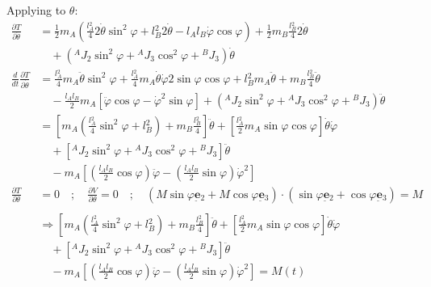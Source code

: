 \documentclass[12pt]{article}
\newcommand{\vb}[1]{{\underset{\tilde{}}{\mathbf{#1}}}}
\begin{document}
 Applying to $\theta$: 
\begin{align*}
    \frac{\partial T}{\partial \dot{\theta}} &= \frac{1}{2}m{}_A \left( \frac{l{}_A^2}{4} 2\dot{\theta}\sin^2\varphi + l{}_B^2 2\dot{\theta} - l{}_A l{}_B \dot{\varphi}\cos\varphi \right) + \frac{1}{2}m{}_B \frac{l{}_B^2}{4} 2\dot{\theta} \\ & \quad + \left({}^A J{}_2 \sin^2\varphi + {}^A J{}_3 \cos^2\varphi + {}^B J{}_3\right) \dot{\theta} \\
    \frac{d}{dt}\frac{\partial T}{\partial \dot{\theta}} &= \frac{l{}_A^2}{4} m{}_A \ddot{\theta}\sin^2\varphi + \frac{l{}_A^2}{4} m{}_A \dot{\theta}\dot{\varphi} 2\sin\varphi\cos\varphi + l{}_B^2 m{}_A \ddot{\theta} + m{}_B \frac{l{}_B^2}{4} \ddot{\theta} \\
    &\quad - \frac{l{}_A l{}_B}{2} m{}_A [\ddot{\varphi}\cos\varphi - \dot{\varphi}^2\sin\varphi] + \left({}^A J{}_2 \sin^2\varphi + {}^A J{}_3 \cos^2\varphi + {}^B J{}_3\right) \ddot{\theta} \\
    &= \left[ m{}_A \left( \frac{l{}_A^2}{4}\sin^2\varphi + l{}_B^2 \right) + m{}_B \frac{l{}_B^2}{4} \right] \ddot{\theta} + \left[ \frac{l{}_A^2}{2} m{}_A \sin\varphi\cos\varphi \right] \dot{\theta}\dot{\varphi}\\ &\quad + \left[ {}^A J{}_2 \sin^2\varphi + {}^A J{}_3 \cos^2\varphi + {}^B J{}_3 \right] \ddot{\theta} \\
    &\quad - m{}_A \left[ \left(\frac{l{}_A l{}_B}{2}\cos\varphi\right)\ddot{\varphi} - \left(\frac{l{}_A l{}_B}{2}\sin\varphi\right)\dot{\varphi}^2 \right] \\
    \frac{\partial T}{\partial \theta} &= 0 \quad ; \quad \frac{\partial V}{\partial \theta} = 0 \quad ; \quad (M\sin\varphi \vb{e}{}_2 + M\cos\varphi \vb{e}{}_3) \cdot (\sin\varphi \vb{e}{}_2 + \cos\varphi \vb{e}{}_3) = M \\
    \\
    &\Rightarrow \left[ m{}_A \left(\frac{l{}_A^2}{4}\sin^2\varphi + l{}_B^2\right) + m{}_B \frac{l{}_B^2}{4} \right] \ddot{\theta} + \left[ \frac{l{}_A^2}{2} m{}_A \sin\varphi \cos\varphi \right] \dot{\theta}\dot{\varphi}\\ &\quad + \left[ {}^A J{}_2 \sin^2\varphi + {}^A J{}_3 \cos^2\varphi + {}^B J{}_3 \right]\ddot{\theta} \\
    &\quad - m{}_A \left[ \left(\frac{l{}_A l{}_B}{2}\cos\varphi\right)\ddot{\varphi} - \left(\frac{l{}_A l{}_B}{2}\sin\varphi\right)\dot{\varphi}^2 \right] = M(t)
\end{align*}
\end{document}

